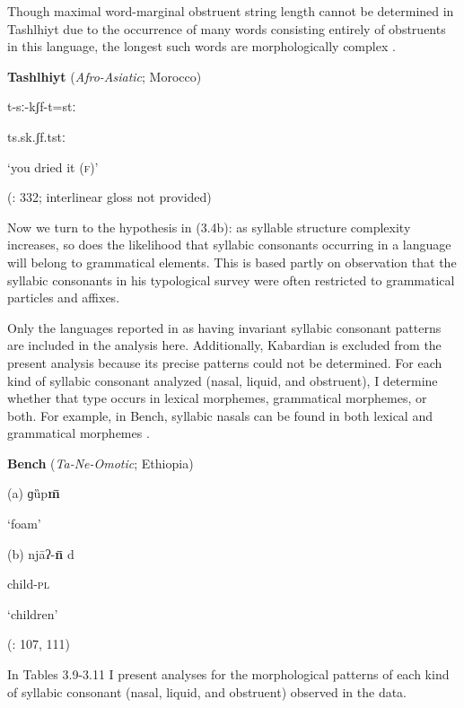 \z

Though maximal word-marginal obstruent string length cannot be determined in Tashlhiyt due to the occurrence of many words consisting entirely of obstruents in this language, the longest such words are morphologically complex .

\ea\label{ex:(3.24)}
  \textbf{Tashlhiyt} (\textit{Afro-Asiatic}; Morocco)

t-sː-kʃf-t=stː

ts.sk.ʃf.tstː

\glt ‘you dried it (\textsc{f})’

(\citealt{Ridouane2008}: 332; interlinear gloss not provided)

\z

  Now we turn to the hypothesis in (3.4b): as syllable structure complexity increases, so does the likelihood that syllabic consonants occurring in a language will belong to grammatical elements. This is based partly on  observation that the syllabic consonants in his typological survey were often restricted to grammatical particles and affixes.

  Only the languages reported in  as having invariant syllabic consonant patterns are included in the analysis here. Additionally, Kabardian is excluded from the present analysis because its precise patterns could not be determined. For each kind of syllabic consonant analyzed (nasal, liquid, and obstruent), I determine whether that type occurs in lexical morphemes, grammatical morphemes, or both. For example, in Bench, syllabic nasals can be found in both lexical and grammatical morphemes .

\ea\label{ex:(3.25)}
  \textbf{Bench} (\textit{Ta-Ne-Omotic}; Ethiopia)

(a)   ɡȕp\textbf{m\={} }

\glt ‘foam’

(b)   njāʔ-\textbf{n\={} }d

child-\textsc{pl}

\glt ‘children’

(\citealt{Rapold2006}: 107, 111)

\z

  In Tables 3.9-3.11 I present analyses for the morphological patterns of each kind of syllabic consonant (nasal, liquid, and obstruent) observed in the data.

